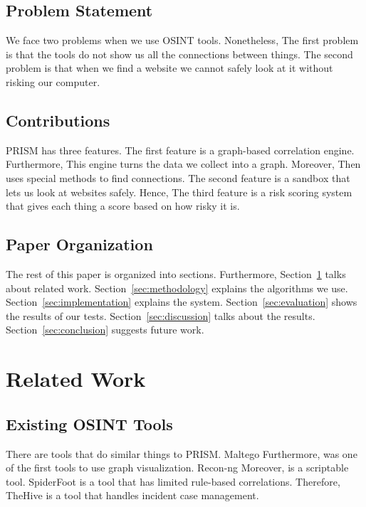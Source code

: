 \documentclass[conference]{IEEEtran}
\begin{document}
\subsection{Problem Statement}

We face two problems when we use OSINT tools. Nonetheless, The first problem is that the tools do not show us all the connections between things. The second problem is that when we find a website we cannot safely look at it without risking our computer.

\subsection{Contributions}

PRISM has three features. The first feature is a graph-based correlation engine. Furthermore, This engine turns the data we collect into a graph. Moreover, Then uses special methods to find connections. The second feature is a sandbox that lets us look at websites safely. Hence, The third feature is a risk scoring system that gives each thing a score based on how risky it is.

\subsection{Paper Organization}

The rest of this paper is organized into sections. Furthermore, Section~\ref{sec:related} talks about related work. Section~\ref{sec:methodology} explains the algorithms we use. Section~\ref{sec:implementation} explains the system. Section~\ref{sec:evaluation} shows the results of our tests. Section~\ref{sec:discussion} talks about the results. Section~\ref{sec:conclusion} suggests future work.

\section{Related Work}
\label{sec:related}

\subsection{Existing OSINT Tools}

There are tools that do similar things to PRISM. Maltego Furthermore, \cite{maltego} was one of the first tools to use graph visualization. Recon-ng Moreover, \cite{recon-ng} is a scriptable tool. SpiderFoot \cite{spiderfoot} is a tool that has limited rule-based correlations. Therefore, TheHive \cite{thehive} is a tool that handles incident case management.
\end{document}
